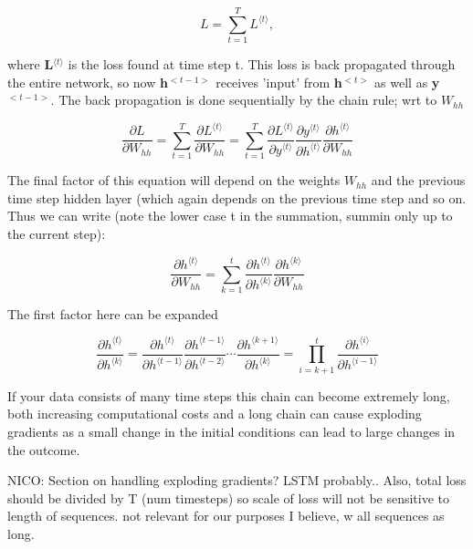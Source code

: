 \begin{equation}
 L = \sum_{t=1}^TL^{\langle t \rangle},
\end{equation}

where \textbf{L$^{\langle t \rangle}$} is the loss found at time step t. This loss is back propagated through the entire network, so now \textbf{h$^{<t-1>}$} receives 'input' from \textbf{h$^{<t>}$} as well as \textbf{y$^{<t-1>}$}.
The back propagation is done sequentially by the chain rule; wrt to $W_{hh}$

\begin{equation}
 \frac{\partial L}{\partial W_{hh}} = \sum_{t=1}^T\frac{\partial L^{\langle t \rangle}}{\partial W_{hh}} = \sum_{t=1}^T \frac{\partial L^{\langle t \rangle}}{\partial y^{\langle t \rangle}}\frac{\partial y^{\langle t \rangle}}{\partial h^{\langle t \rangle}}\frac{\partial h^{\langle t \rangle}}{\partial W_{hh}}
\end{equation}

The final factor of this equation will depend on the weights $W_{hh}$ and the previous time step hidden layer (which again depends on the previous time step and so on.
Thus we can write (note the lower case t in the summation, summin  only up to the current step):

\begin{equation}
 \frac{\partial h^{\langle t \rangle}}{\partial W_{hh}} = \sum_{k=1}^t \frac{\partial h^{\langle t \rangle}}{\partial h^{\langle k \rangle}} \frac{\partial h^{\langle k \rangle}}{\partial W_{hh}}
\end{equation}

The first factor here can be expanded

\begin{equation}
 \frac{\partial h^{\langle t \rangle}}{\partial h^{\langle k \rangle}} = \frac{\partial h^{\langle t \rangle}}{\partial h^{\langle t-1 \rangle}} \frac{\partial h^{\langle t-1 \rangle}}{\partial h^{\langle t-2 \rangle}}  \cdots \frac{\partial h^{\langle k+1 \rangle}}{\partial h^{\langle k \rangle}} = \prod_{i=k+1}^t \frac{\partial h^{\langle i \rangle}}{\partial h^{\langle i-1 \rangle}}
\end{equation}

If your data consists of many time steps this chain can become extremely long, both increasing computational costs and a long chain can cause exploding gradients as a small change in the initial conditions can lead to large changes in the outcome. 

NICO:
Section on handling exploding gradients? LSTM probably..
Also, total loss should be divided by T (num timesteps) so scale of loss will not be sensitive to length of sequences. not relevant for our purposes I believe, w all sequences as long.

